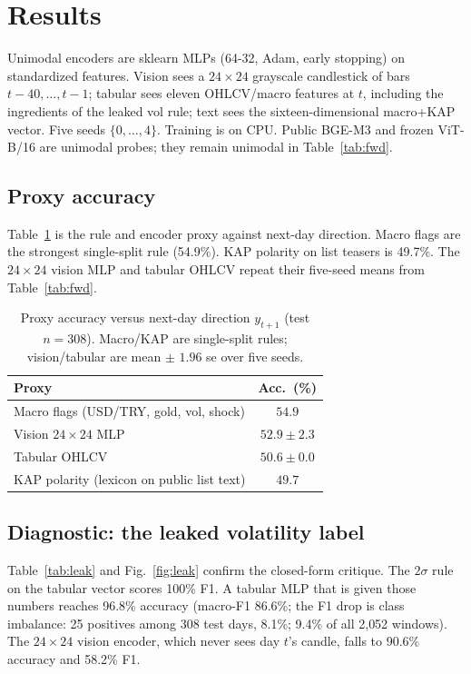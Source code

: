 \documentclass{llncs}
\begin{document}
\section{Results}
\label{sec:exp}
Unimodal encoders are sklearn MLPs (64-32, Adam, early stopping) on standardized features. Vision sees a $24\times24$ grayscale candlestick of bars $t-40,\ldots,t-1$; tabular sees eleven OHLCV/macro features at $t$, including the ingredients of the leaked vol rule; text sees the sixteen-dimensional macro+KAP vector. Five seeds $\{0,\ldots,4\}$. Training is on CPU. Public BGE-M3 and frozen ViT-B/16 are unimodal probes; they remain unimodal in Table~\ref{tab:fwd}.

\subsection{Proxy accuracy}
Table~\ref{tab:proxy} is the rule and encoder proxy against next-day direction. Macro flags are the strongest single-split rule (54.9\%). KAP polarity on list teasers is 49.7\%. The $24\times24$ vision MLP and tabular OHLCV repeat their five-seed means from Table~\ref{tab:fwd}.

\begin{table}[t]
\caption{Proxy accuracy versus next-day direction $y_{t+1}$ (test $n=308$). Macro/KAP are single-split rules; vision/tabular are mean $\pm$ $1.96$ se over five seeds.}
\label{tab:proxy}
\centering
\begin{tabular}{lc}
\toprule
Proxy & Acc.\ (\%) \\
\midrule
Macro flags (USD/TRY, gold, vol, shock) & $54.9$ \\
Vision $24\times24$ MLP & $52.9\pm2.3$ \\
Tabular OHLCV & $50.6\pm0.0$ \\
KAP polarity (lexicon on public list text) & $49.7$ \\
\bottomrule
\end{tabular}
\end{table}

\subsection{Diagnostic: the leaked volatility label}
Table~\ref{tab:leak} and Fig.~\ref{fig:leak} confirm the closed-form critique. The $2\sigma$ rule on the tabular vector scores 100\% F1. A tabular MLP that is given those numbers reaches 96.8\% accuracy (macro-F1 86.6\%; the F1 drop is class imbalance: 25 positives among 308 test days, 8.1\%; 9.4\% of all 2{,}052 windows). The $24\times24$ vision encoder, which never sees day $t$'s candle, falls to 90.6\% accuracy and 58.2\% F1.
\end{document}
